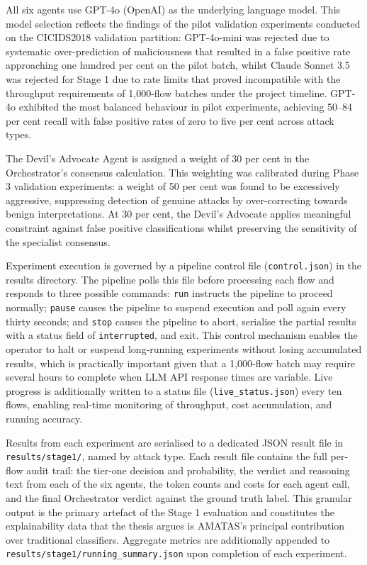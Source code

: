 \documentclass[../main.tex]{subfiles}
\begin{document}
All six agents use GPT-4o (OpenAI) as the underlying language model. This model selection reflects the findings of the pilot validation experiments conducted on the CICIDS2018 validation partition: GPT-4o-mini was rejected due to systematic over-prediction of maliciousness that resulted in a false positive rate approaching one hundred per cent on the pilot batch, whilst Claude Sonnet 3.5 was rejected for Stage 1 due to rate limits that proved incompatible with the throughput requirements of 1,000-flow batches under the project timeline. GPT-4o exhibited the most balanced behaviour in pilot experiments, achieving 50--84 per cent recall with false positive rates of zero to five per cent across attack types.

The Devil's Advocate Agent is assigned a weight of 30 per cent in the Orchestrator's consensus calculation. This weighting was calibrated during Phase 3 validation experiments: a weight of 50 per cent was found to be excessively aggressive, suppressing detection of genuine attacks by over-correcting towards benign interpretations. At 30 per cent, the Devil's Advocate applies meaningful constraint against false positive classifications whilst preserving the sensitivity of the specialist consensus.

Experiment execution is governed by a pipeline control file (\texttt{control.json}) in the results directory. The pipeline polls this file before processing each flow and responds to three possible commands: \texttt{run} instructs the pipeline to proceed normally; \texttt{pause} causes the pipeline to suspend execution and poll again every thirty seconds; and \texttt{stop} causes the pipeline to abort, serialise the partial results with a status field of \texttt{interrupted}, and exit. This control mechanism enables the operator to halt or suspend long-running experiments without losing accumulated results, which is practically important given that a 1,000-flow batch may require several hours to complete when LLM API response times are variable. Live progress is additionally written to a status file (\texttt{live\_status.json}) every ten flows, enabling real-time monitoring of throughput, cost accumulation, and running accuracy.

Results from each experiment are serialised to a dedicated JSON result file in \texttt{results/stage1/}, named by attack type. Each result file contains the full per-flow audit trail: the tier-one decision and probability, the verdict and reasoning text from each of the six agents, the token counts and costs for each agent call, and the final Orchestrator verdict against the ground truth label. This granular output is the primary artefact of the Stage 1 evaluation and constitutes the explainability data that the thesis argues is AMATAS's principal contribution over traditional classifiers. Aggregate metrics are additionally appended to \texttt{results/stage1/running\_summary.json} upon completion of each experiment.
\end{document}
